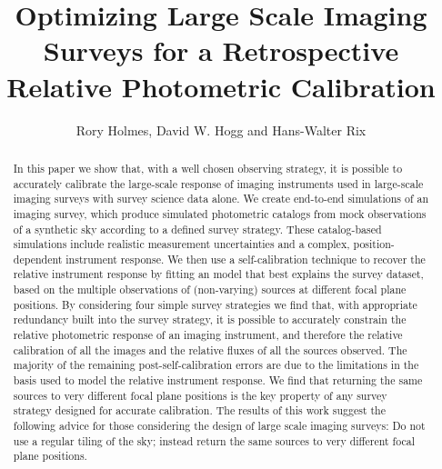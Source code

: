 \documentclass[manuscript]{aastex}
\begin{document}

\title{Optimizing Large Scale Imaging Surveys for a Retrospective Relative Photometric Calibration}


\author{Rory Holmes, David W. Hogg and Hans-Walter Rix}


\begin{abstract}
In this paper we show that, with a well chosen observing strategy, it is possible to accurately calibrate the large-scale response of imaging instruments used in large-scale imaging surveys with survey science data alone. We create end-to-end simulations of an imaging survey, which produce simulated photometric catalogs from mock observations of a synthetic sky according to a defined survey strategy. These catalog-based simulations include realistic measurement uncertainties and a complex, position-dependent instrument response. We then use a self-calibration technique to recover the relative instrument response by fitting an model that best explains the survey dataset, based on the multiple observations of (non-varying) sources at different focal plane positions. By considering four simple survey strategies we find that, with appropriate redundancy built into the survey strategy, it is possible to accurately constrain the relative photometric response of an imaging instrument, and therefore the relative calibration of all the images and the relative fluxes of all the sources observed. The majority of the remaining post-self-calibration errors are due to the limitations in the basis used to model the relative instrument response. We find that returning the same sources to very different focal plane positions is the key property of any survey strategy designed for accurate calibration. The results of this work suggest the following advice for those considering the design of large scale imaging surveys: Do not use a regular tiling of the sky; instead return the same sources to very different focal plane positions.
\end{abstract}
\end{document}
